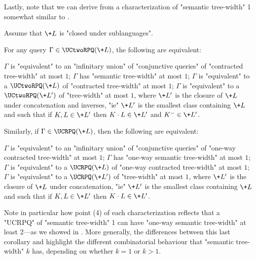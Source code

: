 Lastly, note that we can derive from  a characterization of "semantic tree-width" 1 somewhat similar to .

\begin{corollary}\AP
	\label{coro:charact-semantic-treewidth-1}
	\AP Assume that $\+L$ is "closed under sublanguages". 

	\noindent
     For any query $\Gamma \in \UCtwoRPQ(\+L)$, the following are equivalent:
    \begin{enumerate}
        \itemAP $\Gamma$ is "equivalent" to an "infinitary union" of "conjunctive queries"
            of "contracted tree-width" at most $1$;
        \itemAP $\Gamma$ has "semantic tree-width" at most $1$;
        \itemAP $\Gamma$ is "equivalent" to a $\UCtwoRPQ(\+L)$ of "contracted tree-width" at most $1$;
        \itemAP $\Gamma$ is "equivalent" to a $\UCtwoRPQ(\+L')$ of "tree-width" at most $1$,
			where $\+L'$ is the closure of $\+L$ under concatenation and inverses, "ie"
			$\+L'$ is the smallest class containing $\+L$ and such that  if $K, L \in \+L'$
			then $K\cdot L \in \+L'$ and $K^{-} \in \+L'$.
    \end{enumerate}
	
	\noindent
	 Similarly, if $\Gamma \in \UCRPQ(\+L)$, then the following are equivalent:
	\begin{enumerate}
        \itemAP $\Gamma$ is "equivalent" to an "infinitary union" of "conjunctive queries"
            of "one-way contracted tree-width" at most $1$;
        \itemAP $\Gamma$ has "one-way semantic tree-width" at most $1$;
        \itemAP $\Gamma$ is "equivalent" to a $\UCRPQ(\+L)$ of "one-way contracted tree-width" at most $1$;
        \itemAP $\Gamma$ is "equivalent" to a $\UCRPQ(\+L')$ of "tree-width" at most $1$,
			where $\+L'$ is the closure of $\+L$ under concatenation, "ie"
			$\+L'$ is the smallest class containing $\+L$ and such that if $K, L \in \+L'$
			then $K\cdot L \in \+L'$.
    \end{enumerate}
\end{corollary}

Note in particular how point (4) of each characterization reflects that a "UCRPQ" of
"semantic tree-width" 1 can have "one-way semantic tree-width" at least 2---as we showed in
. More generally, the differences between this
last corollary and  highlight the different combinatorial behaviour that "semantic tree-width" $k$ has, depending on whether $k=1$ or $k > 1$.

